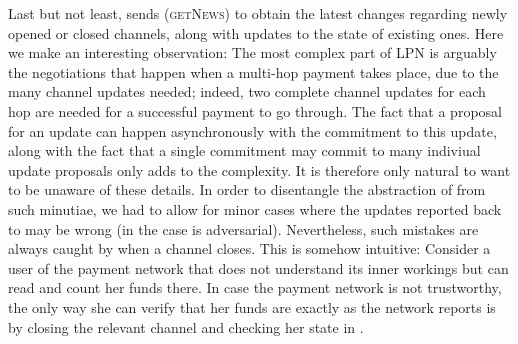   Last but not least, \environment{} sends (\textsc{getNews}) to obtain the
  latest changes regarding newly opened or closed channels, along with updates
  to the state of existing ones. Here we make an interesting observation: The
  most complex part of LPN is arguably the negotiations that happen when a
  multi-hop payment takes place, due to the many channel updates needed; indeed,
  two complete channel updates for each hop are needed for a successful payment
  to go through. The fact that a proposal for an update can happen
  asynchronously with the commitment to this update, along with the fact that a
  single commitment may commit to many indiviual update proposals only adds to
  the complexity. It is therefore only natural to want \fpaynet{} to be unaware
  of these details. In order to disentangle the abstraction of \fpaynet{} from
  such minutiae, we had to allow for minor cases where the updates reported back
  to \environment{} may be wrong (in the case \simulator{} is adversarial).
  Nevertheless, such mistakes are always caught by \fpaynet{} when a channel
  closes. This is somehow intuitive: Consider a user of the payment network that
  does not understand its inner workings but can read \ledger{} and count her
  funds there. In case the payment network is not trustworthy, the only way she
  can verify that her funds are exactly as the network reports is by closing the
  relevant channel and checking her state in \ledger.
